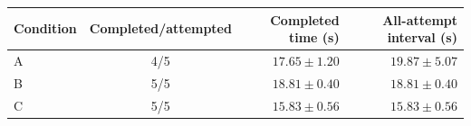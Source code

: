 \begin{tabular}{lcrr}
\toprule
Condition & Completed/attempted & Completed time (s) & All-attempt interval (s) \\
\midrule
A & 4/5 & $17.65 \pm 1.20$ & $19.87 \pm 5.07$ \\
B & 5/5 & $18.81 \pm 0.40$ & $18.81 \pm 0.40$ \\
C & 5/5 & $15.83 \pm 0.56$ & $15.83 \pm 0.56$ \\
\bottomrule
\end{tabular}
